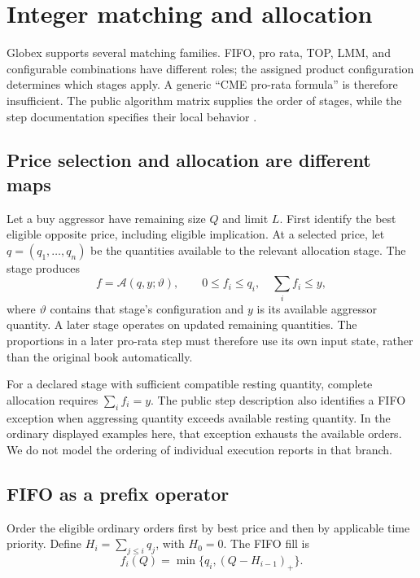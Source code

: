 \section{Integer matching and allocation}
\label{sec:allocation}

Globex supports several matching families. FIFO, pro rata, TOP, LMM, and configurable combinations have different roles; the assigned product configuration determines which stages apply. A generic ``CME pro-rata formula'' is therefore insufficient. The public algorithm matrix supplies the order of stages, while the step documentation specifies their local behavior \citep{CMEMatching,CMESteps}.

\subsection{Price selection and allocation are different maps}

Let a buy aggressor have remaining size $Q$ and limit $L$. First identify the best eligible opposite price, including eligible implication. At a selected price, let $q=(q_1,\ldots,q_n)$ be the quantities available to the relevant allocation stage. The stage produces
\begin{equation}
 f=\mathcal A(q,y;\vartheta),\qquad
 0\le f_i\le q_i,\quad \sum_i f_i\le y,
\end{equation}
where $\vartheta$ contains that stage's configuration and $y$ is its available aggressor quantity. A later stage operates on updated remaining quantities. The proportions in a later pro-rata step must therefore use its own input state, rather than the original book automatically.

For a declared stage with sufficient compatible resting quantity, complete allocation requires $\sum_i f_i=y$. The public step description also identifies a FIFO exception when aggressing quantity exceeds available resting quantity. In the ordinary displayed examples here, that exception exhausts the available orders. We do not model the ordering of individual execution reports in that branch.

\subsection{FIFO as a prefix operator}

Order the eligible ordinary orders first by best price and then by applicable time priority. Define $H_i=\sum_{j\le i}q_j$, with $H_0=0$. The FIFO fill is
\begin{equation}
 f_i(Q)=\min\{q_i,(Q-H_{i-1})_+\}.
\label{eq:fifo}
\end{equation}

